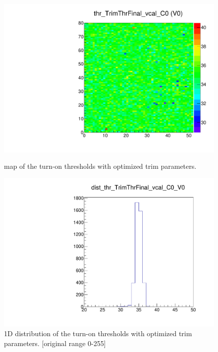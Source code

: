 
\begin{figure}[!htp]
\centering
\begin{minipage}{0.45\textwidth}
  \includegraphics[width=1.0\textwidth]{figures/trim_thr_TrimThrFinal_vcal.pdf}
  \caption{\roc map of the \vcal turn-on thresholds with optimized trim parameters.}
  \label{fig:trim_thr_TrimThrFinal_vcal}
\end{minipage}
\hspace{0.3cm}
\begin{minipage}{0.45\textwidth}
  \includegraphics[width=1.0\textwidth]{figures/trim_dist_thr_TrimThrFinal_vcal.pdf}
  \caption{1D distribution of the \vcal turn-on thresholds with optimized trim parameters. [original range 0-255]}
  \label{fig:trim_dist_thr_TrimThrFinal_vcal}
\end{minipage}
\end{figure}


